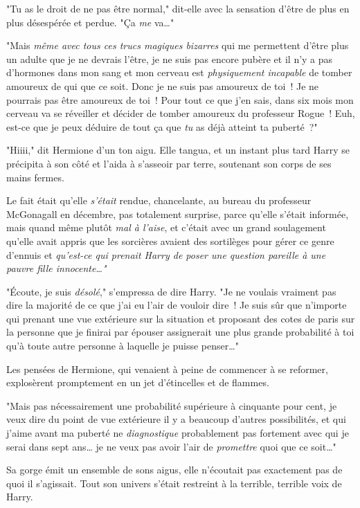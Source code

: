 "Tu as le droit de ne pas être normal," dit-elle avec la sensation d'être de plus en plus désespérée et perdue. "Ça \emph{me} va…"

"Mais \emph{même avec tous ces trucs magiques bizarres} qui me permettent d'être plus un adulte que je ne devrais l'être, je ne suis pas encore pubère et il n'y a pas d'hormones dans mon sang et mon cerveau est \emph{physiquement incapable} de tomber amoureux de qui que ce soit. Donc je ne suis pas amoureux de toi~! Je ne pourrais pas être amoureux de toi~! Pour tout ce que j'en sais, dans six mois mon cerveau va se réveiller et décider de tomber amoureux du professeur Rogue~! Euh, est-ce que je peux déduire de tout ça que \emph{tu} as déjà atteint ta puberté~?"

"Hiiii," dit Hermione d'un ton aigu. Elle tangua, et un instant plus tard Harry se précipita à son côté et l'aida à s'asseoir par terre, soutenant son corps de ses mains fermes.

Le fait était qu'elle \emph{s'était} rendue, chancelante, au bureau du professeur McGonagall en décembre, pas totalement surprise, parce qu'elle s'était informée, mais quand même plutôt \emph{mal à l'aise}, et c'était avec un grand soulagement qu'elle avait appris que les sorcières avaient des sortilèges pour gérer ce genre d'ennuis et \emph{qu'est-ce qui prenait Harry de poser une question pareille à une pauvre fille innocente…"}

"Écoute, je suis \emph{désolé}," s'empressa de dire Harry. "Je ne voulais vraiment pas dire la majorité de ce que j'ai eu l'air de vouloir dire~! Je suis sûr que n'importe qui prenant une vue extérieure sur la situation et proposant des cotes de paris sur la personne que je finirai par épouser assignerait une plus grande probabilité à toi qu'à toute autre personne à laquelle je puisse penser…"

Les pensées de Hermione, qui venaient à peine de commencer à se reformer, explosèrent promptement en un jet d'étincelles et de flammes.

"Mais pas nécessairement une probabilité supérieure à cinquante pour cent, je veux dire du point de vue extérieure il y a beaucoup d'autres possibilités, et qui j'aime avant ma puberté ne \emph{diagnostique} probablement pas fortement avec qui je serai dans sept ans… je ne veux pas avoir l'air de \emph{promettre} quoi que ce soit…"

Sa gorge émit un ensemble de sons aigus, elle n'écoutait pas exactement pas de quoi il s'agissait. Tout son univers s'était restreint à la terrible, terrible voix de Harry.

